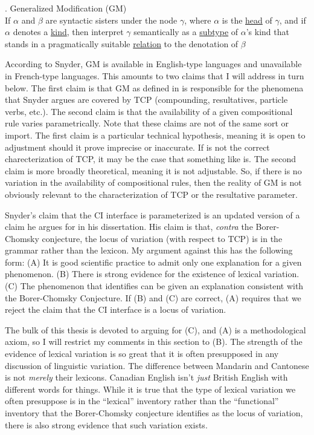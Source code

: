 \documentclass[MilwayThesis]{subfiles}
\begin{document}
\ex. Generalized Modification (GM)\\
If $\alpha$ and $\beta$ are syntactic sisters under the node $\gamma$, where $\alpha$ is the \uline{head} of $\gamma$, and if $\alpha$ denotes a \uline{kind}, then interpret $\gamma$ semantically as a \uline{subtype} of $\alpha$'s kind that stands in a pragmatically suitable \uline{relation} to the denotation of $\beta$

According to Snyder, GM is available in English-type languages and unavailable in French-type languages.
This amounts to two claims that I will address in turn below.
The first claim is that GM as defined in \Last is responsible for the phenomena that Snyder argues are covered by TCP (compounding, resultatives, particle verbs, etc.).
The second claim is that the availability of a given compositional rule varies parametrically.
Note that these claims are not of the same sort or import.
The first claim is a particular technical hypothesis, meaning it is open to adjustment should it prove imprecise or inaccurate.
If \Last is not the correct charecterization of TCP, it may be the case that something like \Last is.
The second claim is more broadly theoretical, meaning it is not adjustable.
So, if there is no variation in the availability of compositional rules, then the reality of GM is not obviously relevant to the characterization of TCP or the resultative parameter.

Snyder's claim that the CI interface is parameterized is an updated version of a claim he argues for in his \citeyear{snyder1995language} dissertation.
His claim is that, \textit{contra} the Borer-Chomsky conjecture, the locus of variation (with respect to TCP) is in the grammar rather than the lexicon.
My argument against this has the following form:
(A) It is good scientific practice to admit only one explanation for a given phenomenon.
(B) There is strong evidence for the existence of lexical variation.
(C) The phenomenon that \textcite{snyder1995language} identifies can be given an explanation consistent with the Borer-Chomsky Conjecture.
If (B) and (C) are correct, (A) requires that we reject the claim that the CI interface is a locus of variation.

The bulk of this thesis is devoted to arguing for (C), and (A) is a methodological axiom, so I will restrict my comments in this section to (B).
The strength of the evidence of lexical variation is so great that it is often presupposed in any discussion of linguistic variation.
The difference between Mandarin and Cantonese is not \textit{merely} their lexicons.
Canadian English isn't \textit{just} British English with different words for things.
While it is true that the type of lexical variation we often presuppose is in the ``lexical'' inventory rather than the ``functional'' inventory that the Borer-Chomsky conjecture identifies as the locus of variation, there is also strong evidence that such variation exists.
\end{document}
